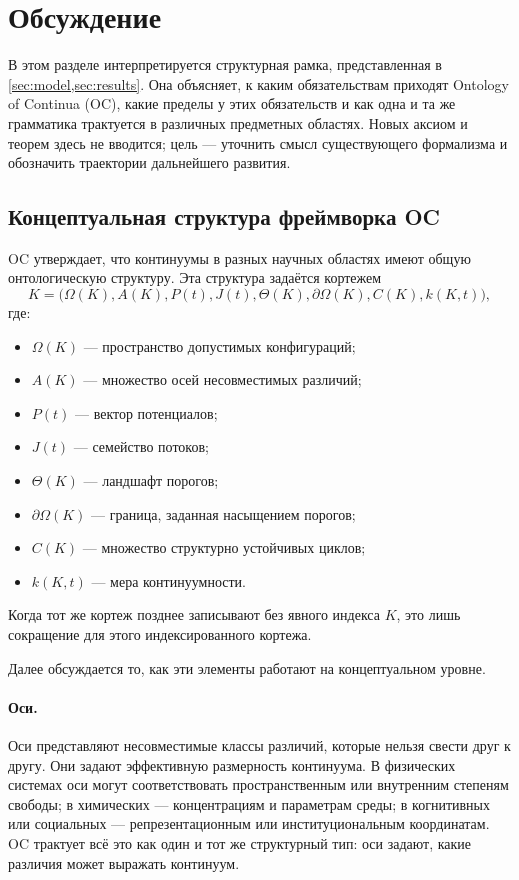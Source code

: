 
\section{Обсуждение}
\label{sec:discussion}

В этом разделе интерпретируется структурная рамка, представленная в
\cref{sec:model,sec:results}. Она объясняет, к каким обязательствам
приходят Ontology of Continua (OC), какие пределы у этих обязательств и как одна и
та же грамматика трактуется в различных предметных областях.
Новых аксиом и теорем здесь не вводится; цель — уточнить смысл существующего
формализма и обозначить траектории дальнейшего развития.

\subsection{Концептуальная структура фреймворка OC}

OC утверждает, что континуумы в разных научных областях имеют общую онтологическую
структуру. Эта структура задаётся кортежем
\[
  K = \big(\Omega(K), A(K), P(t), J(t), \Theta(K), \partial\Omega(K), C(K), k(K,t)\big),
\]
где:
\begin{itemize}
    \item \(\Omega(K)\) — пространство допустимых конфигураций;
    \item \(A(K)\) — множество осей несовместимых различий;
    \item \(P(t)\) — вектор потенциалов;
    \item \(J(t)\) — семейство потоков;
    \item \(\Theta(K)\) — ландшафт порогов;
    \item \(\partial\Omega(K)\) — граница, заданная насыщением порогов;
    \item \(C(K)\) — множество структурно устойчивых циклов;
    \item \(k(K,t)\) — мера континуумности.
\end{itemize}
Когда тот же кортеж позднее записывают без явного индекса \(K\), это лишь
сокращение для этого индексированного кортежа.

Далее обсуждается то, как эти элементы работают на концептуальном уровне.

\paragraph{Оси.}
Оси представляют несовместимые классы различий, которые нельзя свести друг к другу.
Они задают эффективную размерность континуума.
В физических системах оси могут соответствовать пространственным или внутренним
степеням свободы; в химических — концентрациям и параметрам среды; в
когнитивных или социальных — репрезентационным или институциональным
координатам.
OC трактует всё это как один и тот же структурный тип: оси задают, какие различия
может выражать континуум.

